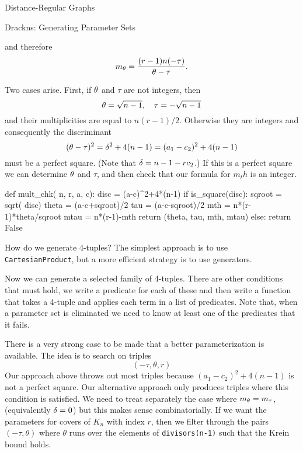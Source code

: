 \begin{chap}{Distance-Regular Graphs}
\begin{sect}{Drackns: Generating Parameter Sets}
\begin{para}
and therefore
\begin{equation}
\label{eq:mult}
    m_\theta = \frac{(r-1)n(-\tau)}{\theta -\tau}.
\end{equation}
\end{para}
%
\begin{para}
Two cases arise. First, if $\theta$ and $\tau$ are not integers, then
\[
    \theta=\sqrt{n-1},\quad \tau=-\sqrt{n-1}
\]
and their multiplicities are equal to $n(r-1)/2$. Otherwise they are integers
and consequently the discriminant
\begin{equation}
\label{eq:discr}
    (\theta-\tau)^2 = \delta^2+4(n-1) = (a_1-c_2)^2+4(n-1)
\end{equation}
must be a perfect square. (Note that $\delta=n-1-rc_2$.) If this is a perfect square
we can determine $\theta$ and $\tau$, and then check that our formula for $m_th$
is an integer.
\end{para}
%
\begin{sagecode}
\begin{sageinput}
def mult_chk( n, r, a, c):
    disc = (a-c)^2+4*(n-1)
    if is_square(disc):
        sqroot = sqrt( disc)
        theta = (a-c+sqroot)/2
        tau = (a-c-sqroot)/2
        mth = n*(r-1)*theta/sqroot
        mtau = n*(r-1)-mth
        return (theta, tau, mth, mtau)
    else:
        return False
\end{sageinput}
\end{sagecode}
%
\begin{para}
How do we generate 4-tuples? The simplest approach is to use \verb|CartesianProduct|,
but a more efficient strategy is to use generators.
\end{para}
%
\begin{para}
Now we can generate a selected family of 4-tuples. There are other conditions
that must hold, we write a predicate for each of these and then write
a function that takes a 4-tuple and applies each term in a list of
predicates. Note that, when a parameter set is eliminated we need to know
at least one of the predicates that it fails.
\end{para}
%
\begin{para}
There is a very strong case to be made that a better parameterization is available.
The idea is to search on triples
\[
    (-\tau,\theta, r)
\]
Our approach above throws out most triples because $(a_1-c_2)^2+4(n-1)$ is not
a perfect square. Our alternative approach only produces triples where
this condition is satisfied. We need to treat separately the case where
$m_\theta=m_\tau$, (equivalently $\delta=0$) but this makes sense combinatorially. 
If we want the parameters for covers of $K_n$ with index $r$, then we filter
through the pairs $(-\tau, \theta)$ where $\theta$ runs over the elements
of \verb|divisors(n-1)| such that the Krein bound holds.
\end{para}
%
\end{sect}
%
\end{chap}